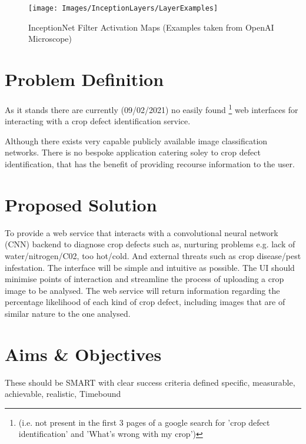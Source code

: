   \begin{landscape}
    \begin{figure}[H]
      \begin{center}
        \texttt{[image: Images/InceptionLayers/LayerExamples]}
        \caption{InceptionNet Filter Activation Maps (Examples taken from OpenAI Microscope)}
        \label{fig:inceptionNet_filter_activation}
      \end{center}
    \end{figure}
  \end{landscape}
  \par

  \newpage


\section{Problem Definition}
  As it stands there are currently (09/02/2021) no easily found \footnote[1]{(i.e. not present in the first 3 pages of a google search for 'crop defect identification' and 'What's wrong with my crop')} web interfaces for interacting with a crop defect identification service.
  \par
  Although there exists very capable publicly available image classification networks. \cite{Yandex} There is no bespoke application catering soley to crop defect identification, that has the benefit of providing recourse information to the user.

\section{Proposed Solution}
  To provide a web service that interacts with a convolutional neural network (CNN) backend to diagnose crop defects such as, nurturing problems e.g. lack of water/nitrogen/C02, too hot/cold. And external threats such as crop disease/pest infestation. The interface will be simple and intuitive as possible. The UI should minimise points of interaction and streamline the process of uploading a crop image to be analysed.
	The web service will return information regarding the percentage likelihood of each kind of crop defect, including images that are of similar nature to the one analysed.

\section{Aims \& Objectives}
  These should be SMART with clear success criteria defined
  specific, measurable, achievable, realistic, Timebound
